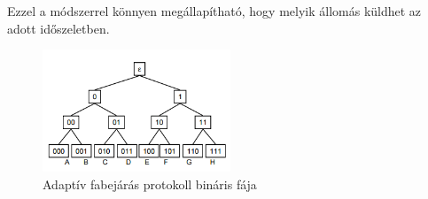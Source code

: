 \documentclass[margin=0px]{article}
\begin{document}
\begin{description}
\begin{description}
\begin{itemize}
\begin{itemize}
                                    Ezzel a módszerrel könnyen megállapítható, hogy melyik állomás küldhet az adott időszeletben.
                                    \begin{figure}[H]
                                        \centering
                                        \includegraphics[width=0.5\textwidth]{img/adaptivfa.png}
                                        \caption{Adaptív fabejárás protokoll bináris fája}
                                    \end{figure}
                          \end{itemize}
                \end{itemize}
        \end{description}
\end{description}
\end{document}
